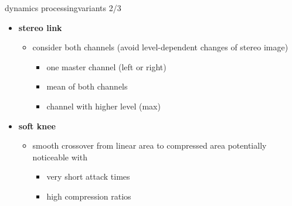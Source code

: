 \begin{frame}{dynamics processing}{variants 2/3}
	\vspace{-5mm}
    \begin{itemize}
		\item	\textbf{stereo link}
			\begin{itemize}
				\item	consider both channels (avoid level-dependent changes of stereo image)
					\pause
					\begin{itemize}
						\item	one master channel (left or right)
						\item	mean of both channels
						\item	channel with higher level (max)
					\end{itemize}
			\end{itemize}
		\pause
        \smallskip
        \smallskip
		\item	\textbf{soft knee}
			\begin{itemize}
				\item	smooth crossover from linear area to compressed area
					\vspace{-20mm}
					\pause
					potentially noticeable with
					\begin{itemize}
						\item	very short attack times
						\item	high compression ratios	
					\end{itemize}
			\end{itemize}
	\end{itemize}
\end{frame}

